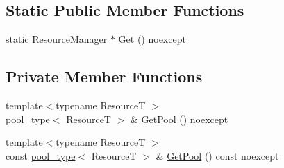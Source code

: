 \subsection*{Static Public Member Functions}
\begin{DoxyCompactItemize}
\item 
static \hyperlink{classmage_1_1_resource_manager}{Resource\+Manager} $\ast$ \hyperlink{classmage_1_1_resource_manager_a1e6ca77d892578fc4df0e62dfbc807f6}{Get} () noexcept
\end{DoxyCompactItemize}
\subsection*{Private Member Functions}
\begin{DoxyCompactItemize}
\item 
{\footnotesize template$<$typename ResourceT $>$ }\\\hyperlink{classmage_1_1_resource_manager_a4416f0a710790d8aa2d0bc006764695a}{pool\+\_\+type}$<$ ResourceT $>$ \& \hyperlink{classmage_1_1_resource_manager_aa52be1d19262ba48761a8bf3a7228d76}{Get\+Pool} () noexcept
\item 
{\footnotesize template$<$typename ResourceT $>$ }\\const \hyperlink{classmage_1_1_resource_manager_a4416f0a710790d8aa2d0bc006764695a}{pool\+\_\+type}$<$ ResourceT $>$ \& \hyperlink{classmage_1_1_resource_manager_af0e98b448cddce09b1026fb38c4ab923}{Get\+Pool} () const noexcept
\end{DoxyCompactItemize}
